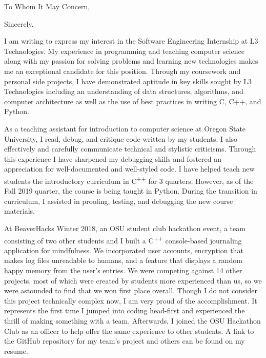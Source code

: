 \documentclass[11pt,a4paper,roman]{moderncv}        %
\begin{document}
\date{October 19, 2019}
\opening{To Whom It May Concern,}
\closing{Sincerely,}
\makelettertitle

I am writing to express my interest in the Software Engineering Internship at L3 Technologies. My experience in programming and  teaching computer science along with my passion for solving problems and learning new technologies makes me an exceptional candidate for this position. Through my coursework and personal side projects, I have demonstrated aptitude in key skills sought by L3 Technologies including an understanding of data structures, algorithms, and computer architecture as well as the use of best practices in writing C, C++, and Python. 
 
As a teaching assistant for introduction to computer science at Oregon State University, I read, debug, and critique code written by my students. I also effectively and carefully communicate technical and stylistic criticisms. Through this experience I have sharpened my debugging skills and fostered an appreciation for well-documented and well-styled code. I have helped teach new students the introductory curriculum in C\textsuperscript{++} for 3 quarters. However, as of the Fall 2019 quarter, the course is being taught in Python. During the transition in curriculum, I assisted in proofing, testing, and debugging the new course materials.
 
At BeaverHacks Winter 2018, an OSU student club hackathon event, a team consisting of two other students and I built a C\textsuperscript{++} console-based journaling application for mindfulness. We incorporated user accounts, encryption that makes log files unreadable to humans, and a feature that displays a random happy memory from the user's entries. We were competing against 14 other projects, most of which were created by students more experienced than us, so we were astounded to find that we won first place overall. Though I do not consider this project technically complex now, I am very proud of the accomplishment. It represents the first time I jumped into coding head-first and experienced the thrill of making something with a team. Afterwards, I joined the OSU Hackathon Club as an officer to help offer the same experience to other students. A link to the GitHub repository for my team's project and others can be found on my resume.
 
\end{document}
